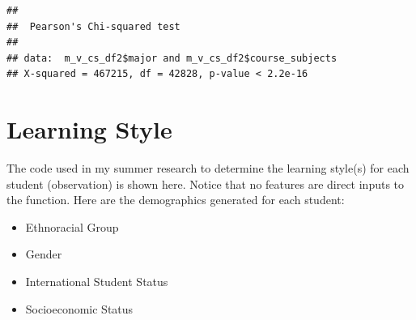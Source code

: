 \documentclass[
  twocolumn]{article}
\newenvironment{Shaded}{\begin{snugshade}}{\end{snugshade}}
\newcommand{\AttributeTok}[1]{\textcolor[rgb]{0.13,0.29,0.53}{#1}}
\newcommand{\CommentTok}[1]{\textcolor[rgb]{0.56,0.35,0.01}{\textit{#1}}}
\newcommand{\ConstantTok}[1]{\textcolor[rgb]{0.56,0.35,0.01}{#1}}
\newcommand{\DecValTok}[1]{\textcolor[rgb]{0.00,0.00,0.81}{#1}}
\newcommand{\FunctionTok}[1]{\textcolor[rgb]{0.13,0.29,0.53}{\textbf{#1}}}
\newcommand{\NormalTok}[1]{#1}
\newcommand{\OtherTok}[1]{\textcolor[rgb]{0.56,0.35,0.01}{#1}}
\newcommand{\SpecialCharTok}[1]{\textcolor[rgb]{0.81,0.36,0.00}{\textbf{#1}}}
\newcommand{\StringTok}[1]{\textcolor[rgb]{0.31,0.60,0.02}{#1}}
\providecommand{\tightlist}{%
  \setlength{\itemsep}{0pt}\setlength{\parskip}{0pt}}
\begin{document}
\begin{Shaded}
\end{Shaded}

\begin{verbatim}
## 
##  Pearson's Chi-squared test
## 
## data:  m_v_cs_df2$major and m_v_cs_df2$course_subjects
## X-squared = 467215, df = 42828, p-value < 2.2e-16
\end{verbatim}

\section{Learning Style}\label{learning-style}

The code used in my summer research to determine the learning style(s)
for each student (observation) is shown here. Notice that no features
are direct inputs to the function. Here are the demographics generated
for each student:

\begin{itemize}
\tightlist
\item
  Ethnoracial Group
\item
  Gender
\item
  International Student Status
\item
  Socioeconomic Status
\end{itemize}
\end{document}
